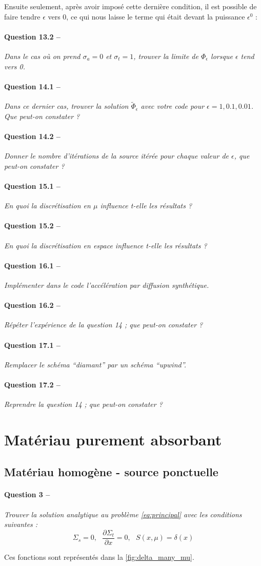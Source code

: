 \documentclass[11pt,a4paper]{article}
\newcommand{\dx}[1]{\dfrac{\partial #1}{\partial x}}
\newcommand{\question}[2]{\paragraph{Question #1 --}\hspace{-7pt}\textit{#2} \\}
\newcommand{\Phit}{\widetilde{\Phi}}
\begin{document}
Ensuite seulement, après avoir imposé cette dernière condition, il est possible de faire tendre $\epsilon$ vers 0, ce qui nous laisse le terme qui était devant la puissance $\epsilon^0$ :


\question{13.2}{Dans le cas où on prend $\sigma_a = 0$ et $\sigma_t = 1$, trouver la limite de $\Phi_\epsilon$ lorsque $\epsilon$ tend vers 0.}
\question{14.1}{Dans ce dernier cas, trouver la solution $\Phit_\epsilon$ avec votre code pour $\epsilon = 1, 0.1, 0.01$. Que peut-on constater ?}
\question{14.2}{Donner le nombre d'itérations de la source itérée pour chaque valeur de $\epsilon$, que peut-on constater ?}
\question{15.1}{En quoi la discrétisation en $\mu$ influence t-elle les résultats ?}
\question{15.2}{En quoi la discrétisation en espace influence t-elle les résultats ?}
\question{16.1}{Implémenter dans le code l'accélération par diffusion synthétique.}
\question{16.2}{Répéter l'expérience de la question 14 ; que peut-on constater ?}
\question{17.1}{Remplacer le schéma ``diamant'' par un schéma ``upwind''.}
\question{17.2}{Reprendre la question 14 ; que peut-on constater ?}
 
 
\section{Matériau purement absorbant}

\subsection{Matériau homogène - source ponctuelle}

\question{3}{Trouver la solution analytique au problème \autoref{eq:principal} avec les conditions suivantes :}

\begin{equation}
  \Sigma_s=0, ~~~ \dx{\Sigma_t} = 0, ~~~ S(x, \mu) = \delta(x)
\end{equation}





Ces fonctions sont représentés dans la \autoref{fig:delta_many_mu}.
\end{document}
